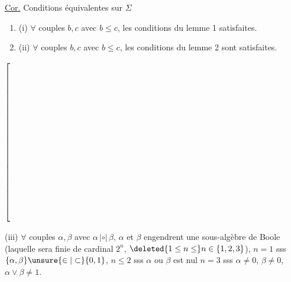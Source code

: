 \uline{Cor.} Conditions équivalentes sur $\Sigma$
\begin{enumerate}[label={},leftmargin=1.8em]
\item (i) $\forall$ couples $b,c$ avec $b\leq c$, les conditions du lemme 1 satisfaites.
\item (ii) $\forall$ couples $b,c$ avec $b\leq c$, les conditions  du lemme 2 sont satisfaites.
\end{enumerate}
\noindent$\left[\rule{0pt}{10em}\right.$\begin{minipage}{0.88\linewidth}
(iii) $\forall$ couples $\alpha,\beta$ avec $\alpha\,|\circ|\,\beta$, $\alpha$ et $\beta$ engendrent une sous-algèbre de Boole (laquelle sera  finie de cardinal $2^n$, $\deleted{1\leq n\leq}n\in\{1,2,3\}$), $n=1$ sss $\{\alpha,\beta\}\unsure{\in|\subset}\{0,1\}$, $n\leq2$ sss $\alpha$ ou $\beta$ est nul     $n=3$ sss $\alpha\ne0$, $\beta\ne0$, $\alpha\vee\beta\ne1$.

\end{minipage}
